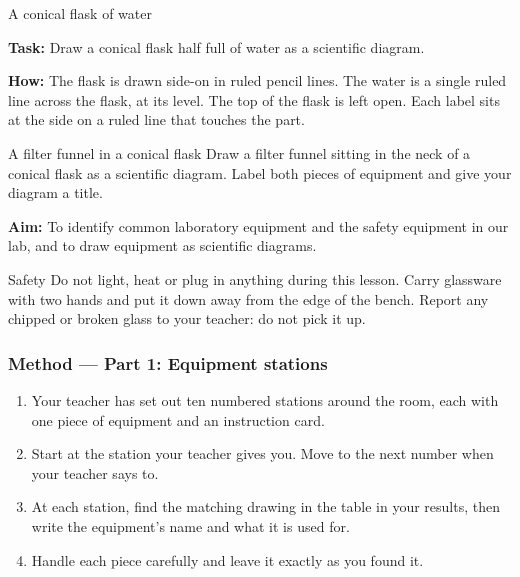 \begin{workedex}{A conical flask of water}
\begin{minipage}[c]{0.5\linewidth}
\textbf{Task:} Draw a conical flask half full of water as a scientific diagram.

\smallskip
\textbf{How:} The flask is drawn side-on in ruled pencil lines. The water is a single ruled line across the flask, at its level. The top of the flask is left open. Each label sits at the side on a ruled line that touches the part.
\end{minipage}\hfill
\begin{minipage}[c]{0.44\linewidth}\centering
{}
\end{minipage}
\end{workedex}

\begin{wedo}{A filter funnel in a conical flask}
Draw a filter funnel sitting in the neck of a conical flask as a scientific diagram. Label both pieces of equipment and give your diagram a title.
\drawbox{4.5cm}{}
\end{wedo}


\textbf{Aim:} To identify common laboratory equipment and the safety equipment in our lab, and to draw equipment as scientific diagrams.

\begin{infobox}{Safety}
Do not light, heat or plug in anything during this lesson. Carry glassware with two hands and put it down away from the edge of the bench. Report any chipped or broken glass to your teacher: do not pick it up.
\end{infobox}

\subsubsection*{Method --- Part 1: Equipment stations}
\begin{enumerate}[itemsep=2pt]
  \item Your teacher has set out ten numbered stations around the room, each with one piece of equipment and an instruction card.
  \item Start at the station your teacher gives you. Move to the next number when your teacher says to.
  \item At each station, find the matching drawing in the table in your results, then write the equipment's name and what it is used for.
  \item Handle each piece carefully and leave it exactly as you found it.
\end{enumerate}

